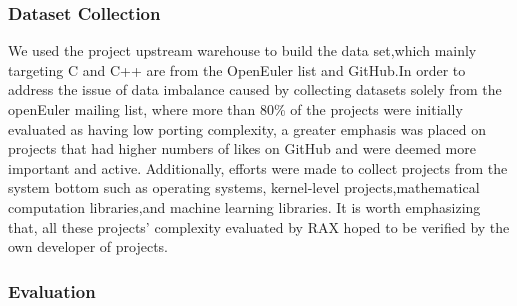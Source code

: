 \documentclass[sigconf,screen,review,anonymous]{acmart}
\begin{document}
{\subsubsection{Dataset Collection}

We used the project upstream warehouse to build the data set,which mainly targeting C and C++ are from the OpenEuler list and GitHub\citep{stage2023}.In order to address the issue of data imbalance caused by collecting datasets solely from the openEuler mailing list, where more than 80\% of the projects were initially evaluated as having low porting complexity, a greater emphasis was placed on projects that had higher numbers of likes on GitHub and were deemed more important and active. Additionally, efforts were made to collect projects from the system bottom such as operating systems, kernel-level projects,mathematical computation libraries,and machine learning libraries. It is worth emphasizing that, all these projects' complexity evaluated by RAX hoped to be verified  by the own developer of projects.

\subsubsection{Evaluation}
  
}
\end{document}
